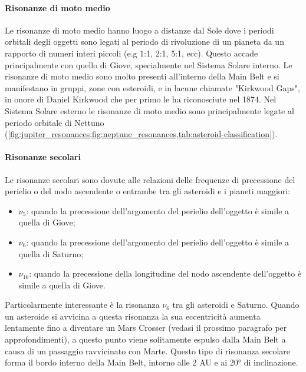 \documentclass[a4paper,11pt,openright]{book}
\begin{document}
\paragraph*{Risonanze di moto medio} 
Le risonanze di moto medio hanno luogo a distanze dal Sole dove i periodi orbitali degli oggetti sono legati al periodo di rivoluzione di un pianeta da un rapporto di numeri interi piccoli (e.g 1:1, 2:1, 5:1, ecc). Questo accade principalmente con quello di Giove, specialmente nel Sistema Solare interno. Le risonanze di moto medio sono molto presenti all'interno della Main Belt e si manifestano in gruppi, zone con esteroidi, e in lacune chiamate "Kirkwood Gaps", in onore di Daniel Kirkwood che per primo le ha riconosciute nel 1874. Nel Sistema Solare esterno le risonanze di moto medio sono principalmente legate al periodo orbitale di Nettuno %
 (\cref{fig:jupiter_resonances,fig:neptune_resonances,tab:asteroid-classification}).

\paragraph*{Risonanze secolari}
Le risonanze secolari sono dovute alle relazioni delle frequenze di precessione del perielio o del nodo ascendente o entrambe tra gli asteroidi e i pianeti maggiori:
\begin{itemize}
    \item $\nu_5$: quando la precessione dell'argomento del perielio dell'oggetto è simile a quella di Giove;
    \item $\nu_6$: quando la precessione dell'argomento del perielio dell'oggetto è simile a quella di Saturno;
    \item $\nu_{16}$: quando la precessione della longitudine del nodo ascendente dell'oggetto è simile a quella di Giove.
\end{itemize} 
Particolarmente interessante è la risonanza $\nu_6$ tra gli asteroidi e Saturno. Quando un asteroide si avvicina a questa risonanza la sua eccentricità aumenta lentamente fino a diventare un Mars Crosser (vedasi il prossimo paragrafo per approfondimenti), a questo punto viene solitamente espulso dalla Main Belt a causa di un passaggio ravvicinato con Marte. Questo tipo di risonanza secolare forma il bordo interno della Main Belt, intorno alle 2 AU e ai 20° di inclinazione.
\end{document}
